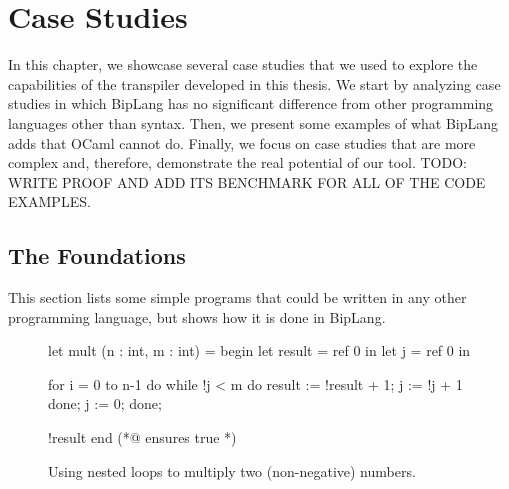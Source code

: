 
%


\chapter{Case Studies}
\label{cha:case_studies}

In this chapter, we showcase several case studies that we used to explore the capabilities of the transpiler developed in this thesis.
We start by analyzing case studies in which BipLang has no significant difference from other programming languages other than syntax.
Then, we present some examples of what BipLang adds that OCaml cannot do.
Finally, we focus on case studies that are more complex and, therefore, demonstrate the real potential of our tool.
TODO: WRITE PROOF AND ADD ITS BENCHMARK FOR ALL OF THE CODE EXAMPLES. 


\section{The Foundations}
\label{sec:foundations}

This section lists some simple programs that could be written in any other programming language, but shows how it is done in BipLang.

\begin{figure}
\begin{minipage}{\linewidth}
\begin{biplangenv}
  let mult (n : int, m : int) = begin
    let result = ref 0 in
    let j = ref 0 in

    for i = 0 to n-1 do
      while !j < m do
        result := !result + 1;
        j := !j + 1
      done;
      j := 0;
    done;
    
    !result
  end
  (*@ ensures true *)
\end{biplangenv}
\end{minipage}
\caption{Using nested loops to multiply two (non-negative) numbers.}
\end{figure}

